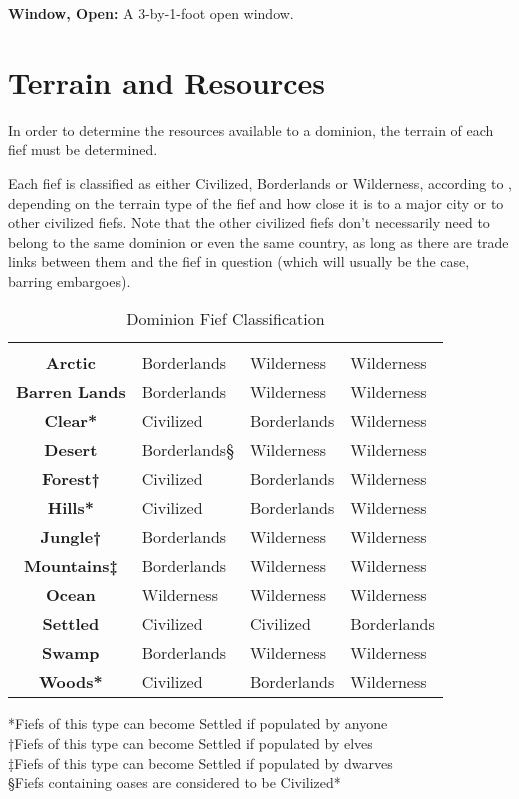 \begin{multicols*}{2}
\textbf{Window, Open:} A 3-by-1-foot open window.

\section{Terrain and Resources}
In order to determine the resources available to a dominion, the terrain of each fief must be determined.

Each fief is classified as either Civilized, Borderlands or Wilderness, according to , depending on the terrain type of the fief and how close it is to a major city or to other civilized fiefs. Note that the other civilized fiefs don’t necessarily need to belong to the same dominion or even the same country, as long as there are trade links between them and the fief in question (which will usually be the case, barring embargoes).

\begin {table}[H]
  \caption{Dominion Fief Classification}\label{tab:Dominion Fief Classification}
	\begin{tabularx}{\columnwidth}{>{\bfseries}cYM{1in}Y}
	 &  &  & \\
	Arctic &  Borderlands & Wilderness & Wilderness\\
	Barren Lands & Borderlands & Wilderness & Wilderness\\
	Clear* & Civilized & Borderlands & Wilderness\\
	Desert & Borderlands§ & Wilderness & Wilderness\\
	Forest† & Civilized & Borderlands & Wilderness\\
	Hills* & Civilized & Borderlands & Wilderness\\
	Jungle† & Borderlands & Wilderness & Wilderness\\
	Mountains‡ & Borderlands & Wilderness & Wilderness\\
	Ocean & Wilderness & Wilderness & Wilderness\\
	Settled & Civilized & Civilized & Borderlands\\
	Swamp & Borderlands & Wilderness & Wilderness\\
	Woods* & Civilized & Borderlands & Wilderness
  \end {tabularx}
	*Fiefs of this type can become Settled if populated by anyone\\
	†Fiefs of this type can become Settled if populated by elves\\
	‡Fiefs of this type can become Settled if populated by dwarves\\
	§Fiefs containing oases are considered to be Civilized*
\end {table}


\end{multicols*}
